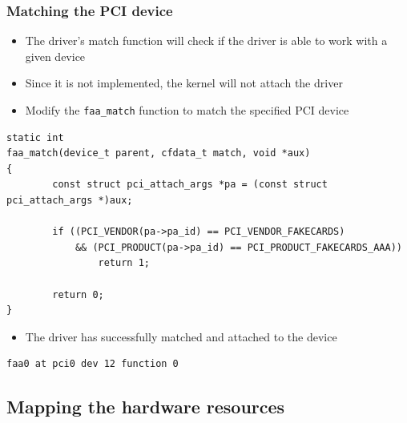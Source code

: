 \documentclass[dvipsnames,table]{beamer}
\begin{document}
\begin{frame}[fragile]
\frametitle{Matching the PCI device}
\begin{itemize}
	\item The driver's match function will check if the driver is able to work with a given device
 	\item Since it is not implemented, the kernel will not attach the driver
	\item Modify the {\tt faa\_match} function to match the specified PCI device
\end{itemize}
\scriptsize
\begin{lstlisting}
static int
faa_match(device_t parent, cfdata_t match, void *aux)
{
        const struct pci_attach_args *pa = (const struct pci_attach_args *)aux;

        if ((PCI_VENDOR(pa->pa_id) == PCI_VENDOR_FAKECARDS) 
            && (PCI_PRODUCT(pa->pa_id) == PCI_PRODUCT_FAKECARDS_AAA))
                return 1;

        return 0;
}
\end{lstlisting}
\normalsize
\begin{itemize}
	\item The driver has successfully matched and attached to the device
\end{itemize}
\begin{verbatim}
faa0 at pci0 dev 12 function 0
\end{verbatim}
\end{frame}



\subsection{Mapping the hardware resources}
\end{document}

